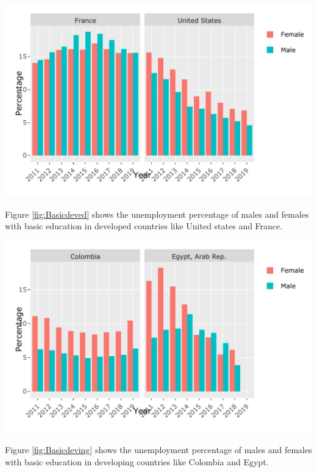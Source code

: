 \documentclass[11pt,a4paper,]{article}
\let\origfigure\figure
\let\endorigfigure\endfigure
\renewenvironment{figure}[1][2] {
    \expandafter\origfigure\expandafter[H]
} {
    \endorigfigure
}
\begin{document}
\begin{figure}
\centering
\includegraphics{The_Outsiders_5513_files/figure-latex/Basicdeved-1.pdf}
\caption{\label{fig:Basicdeved}Unemployment with basic education in developed countries}
\end{figure}

Figure \ref{fig:Basicdeved} shows the unemployment percentage of males and females with basic education in developed countries like United states and France.

\begin{figure}
\centering
\includegraphics{The_Outsiders_5513_files/figure-latex/Basicdeving-1.pdf}
\caption{\label{fig:Basicdeving}Unemployment with basic education in developing countries}
\end{figure}

Figure \ref{fig:Basicdeving} shows the unemployment percentage of males and females with basic education in developing countries like Colombia and Egypt.
\end{document}
